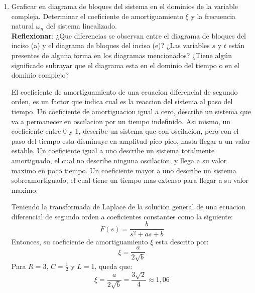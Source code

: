 \documentclass[12pt,a4paper]{report}
\begin{document}
\begin{enumerate}[label=\alph*)]
  \item Graficar en diagrama de bloques del sistema en el dominios de la variable compleja.  Determinar el coeficiente
    de amortiguamiento $\xi$ y la frecuencia natural $\omega_n$ del sistema linealizado.\\
    \textbf{Reflexionar}: ¿Que diferencias se observan entre el diagrama de bloques del inciso (a) y el diagrama de
    bloques del inciso (e)? ¿Las variables $s$ y $t$ están presentes de alguna forma en los diagramas mencionados? ¿Tiene
    algún significado subrayar que el diagrama esta en el dominio del tiempo o en el dominio complejo?

    El coeficiente de amortiguamiento de una ecuacion diferencial de segundo orden, es un factor que indica cual es la
    reaccion del sistema al paso del tiempo. Un coeficiente de amortiguacion igual a cero, describe un sistema
    que va a permanecer en oscilacion por un tiempo indefinido. Asi mismo, un coeficiente entre 0 y
    1, describe un sistema que con oscilacion, pero con el paso del tiempo esta disminuye en amplitud pico-pico,
    hasta llegar a un valor estable. Un coeficiente igual a uno describe un sistema totalmente amortiguado, el cual no
    describe ninguna oscilacion, y llega a su valor maximo en poco tiempo. Un coeficiente mayor a uno describe un sistema
    sobreamortiguado, el cual tiene un tiempo mas extenso para llegar a su valor maximo.

    Teniendo la transformada de Laplace de la solucion general de una ecuacion diferencial de segundo orden a
    coeficientes constantes como la siguiente:
    \begin{equation*}
      F(s) = \frac{b}{s^2+as+b}
    \end{equation*}
    Entonces, su coeficiente de amortiguamiento $\xi$ esta descrito por:
    \begin{equation*}
      \xi = \frac{a}{2\sqrt{b}}
    \end{equation*}
    Para $R = 3$, $C = \frac{1}{2}$ y $L = 1$, queda que:
    \begin{equation*}
      \xi = \frac{a}{2\sqrt{b}} = \frac{3\sqrt{2}}{4} \approx 1,\!06
    \end{equation*}


\end{enumerate}
\end{document}
